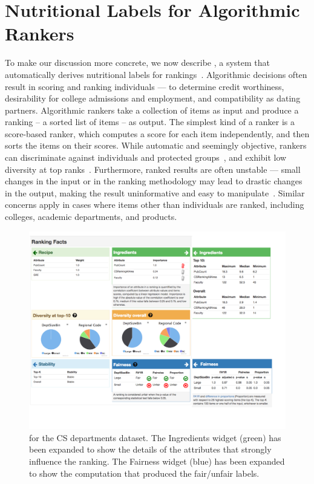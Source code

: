 \section{Nutritional Labels for Algorithmic Rankers}
\label{sec:rankingFacts}

To make our discussion more concrete, we now describe \rf, a system that automatically derives nutritional labels for rankings~\cite{DBLP:conf/sigmod/YangSAHJM18}. 
%
Algorithmic decisions often result in scoring and ranking individuals --- to determine credit worthiness, desirability for college admissions and employment, and compatibility as dating partners.   Algorithmic rankers take a collection of items as input and produce a ranking – a sorted list of items – as output. The simplest kind of a ranker is a score-based ranker, which computes a score for each item independently, and then sorts the items on their scores.  While automatic and seemingly objective, rankers can discriminate against individuals and protected groups~\cite{CitronP14}, and exhibit low diversity at top ranks~\cite{DBLP:conf/edbt/StoyanovichAM11}. Furthermore, ranked results are often unstable --- small changes in the input or in  the ranking methodology may lead to drastic changes in the output, making the result uninformative and easy to manipulate~\cite{gladwell}.  Similar concerns apply in cases where items other than individuals are ranked, including colleges, academic departments, and products.

\begin{figure}[t!]	
\centering
\includegraphics[width=\linewidth]{figs/label.pdf}
     \caption{\rf for the CS departments dataset. The Ingredients widget (green) has been expanded to show the details of the attributes that strongly influence the ranking.  The Fairness widget (blue) has been expanded to show the computation that produced the fair/unfair labels.}
     \label{fig:label}
\end{figure}

